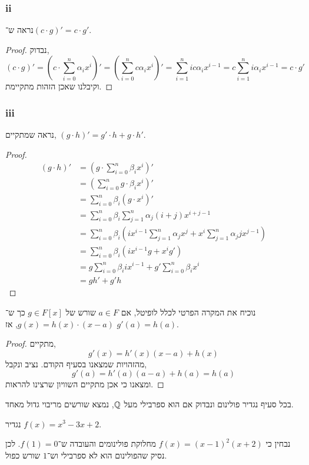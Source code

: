 \subsubsection{ii}
נראה ש־$(c \cdot g)' = c \cdot g'$.
\begin{proof}
	נבדוק,
	\[
		(c \cdot g)'
		= \left( c \cdot \sum_{i = 0}^n \alpha_i x^i \right)'
		= \left( \sum_{i = 0}^n c \alpha_i x^i \right)'
		= \sum_{i = 1}^n i c \alpha_i x^{i - 1}
		= c \sum_{i = 1}^n i \alpha_i x^{i - 1}
		= c \cdot g'
	\]
	וקיבלנו שאכן הזהות מתקיימת.
\end{proof}

\subsubsection{iii}
נראה שמתקיים, $(g \cdot h)' = g' \cdot h + g \cdot h'$.
\begin{proof}
	\begin{align*}
		(g \cdot h)'
		& = \left( g \cdot \sum_{i = 0}^n \beta_i x^i \right)' \\
		& = \left( \sum_{i = 0}^n g \cdot \beta_i x^i \right)' \\
		& = \sum_{i = 0}^n \beta_i (g \cdot x^i)' \\
		& = \sum_{i = 0}^n \beta_i \sum_{j = 1}^n \alpha_j (i + j) x^{i + j - 1} \\
		& = \sum_{i = 0}^n \beta_i \left( i x^{i - 1} \sum_{j = 1}^n \alpha_j x^j + x^i \sum_{j = 1}^n \alpha_j j x^{j - 1} \right) \\
		& = \sum_{i = 0}^n \beta_i \left( i x^{i - 1} g + x^i g' \right) \\
		& = g \sum_{i = 0}^n \beta_i i x^{i - 1} + g' \sum_{i = 0}^n \beta_i x^i \\
		& = g h' + g' h
	\end{align*}
\end{proof}

\subquestion{}
נוכיח את המקרה הפרטי לכלל לופיטל,
אם $a \in F$ שורש של $g \in F[x]$ כך ש־$g(x) = h(x) \cdot (x - a)$, אז $g'(a) = h(a)$.
\begin{proof}
	מתקיים,
	\[
		g'(x)
		= h'(x) (x - a) + h(x)
	\]
	מהזהויות שמצאנו בסעיף הקודם.
	נציב ונקבל,
	\[
		g'(a)
		= h'(a) (a - a) + h(a)
		= h(a)
	\]
	ומצאנו כי אכן מתקיים השוויון שרצינו להראות.
\end{proof}

\question{}
בכל סעיף נגדיר פולינום ונבדוק אם הוא ספרבילי מעל $\mathbb{Q}$, נמצא שורשים מריבוי גדול מאחד.

\subquestion{}
נגדיר $f(x) = x^3 - 3x + 2$.
\begin{solution}
	נבחין כי $f(x) = {(x - 1)}^2 (x + 2)$ מחלוקת פולינומים והעובדה ש־$f(1) = 0$.
	לכן נסיק שהפולינום הוא לא ספרבילי וש־$1$ שורש כפול.
\end{solution}

